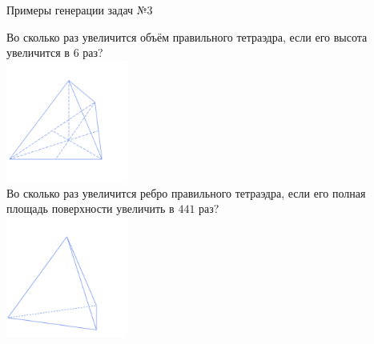 \documentclass[aspectratio=169,12pt]{beamer}
\begin{document}
\begin{frame}{Примеры генерации задач №3}
	\begin{multicols}{4}
		Во сколько раз увеличится объём правильного тетраэдра, если его высота увеличится в $6$ раз?\\

		\includegraphics[width=0.3\textwidth]{images/3}\\

		Во сколько раз увеличится ребро правильного тетраэдра, если его полная площадь поверхности увеличить в $441$ раз?\\

		\includegraphics[width=0.3\textwidth]{images/4}

	\end{multicols}
\end{frame}
\end{document}
